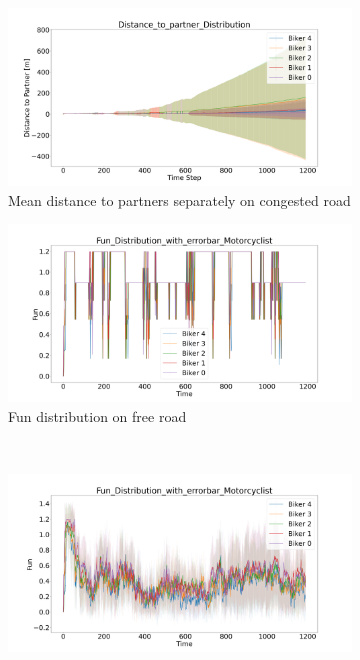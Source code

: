 \begin{figure}[H]
	\centering
	\begin{subfigure}[b]{0.45\textwidth}
		\centering
		\includegraphics[width=1.0\textwidth]{images/Sandstrase/Sandstrase_Distance_to_partner_distribution_congested.png}
		\caption{Mean distance to partners separately on congested road}
	\end{subfigure}
	\hfill
	\begin{subfigure}[b]{0.45\textwidth}
		\centering
		\includegraphics[width=1.0\textwidth]{images/Sandstrase/Sandstrase_Fun_Distribution_with_errorbar_free.png}
		\caption{Fun distribution on free road}
	\end{subfigure}
	\\
	\begin{subfigure}[b]{0.45\textwidth}
		\centering
		\includegraphics[width=1.0\textwidth]{images/Sandstrase/Sandstrase_Fun_Distribution_with_errorbar_congested.png}

\end{subfigure}
\end{figure}
